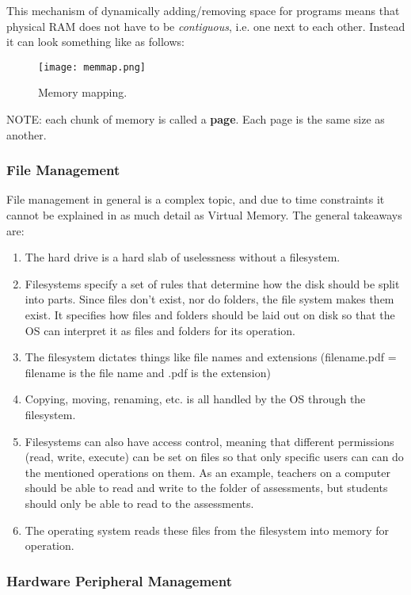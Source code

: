 \documentclass[../main.tex]{subfiles}
\begin{document}
This mechanism of dynamically adding/removing space for programs means that physical RAM does not have to be \emph{contiguous}, i.e. one next to each other. Instead it can look something like as follows:

\begin{figure}[H]
    \centering
    \texttt{[image: memmap.png]}
    \caption{Memory mapping.}
    \label{fig:memmap}
\end{figure}

NOTE: each chunk of memory is called a \textbf{page}. Each page is the same size as another.

\subsubsection{File Management}

File management in general is a complex topic, and due to time constraints it cannot be explained in as much detail as Virtual Memory. The general takeaways are:

\begin{enumerate}
    \item The hard drive is a hard slab of uselessness without a filesystem.
    \item Filesystems specify a set of rules that determine how the disk should be split into parts. Since files don't exist, nor do folders, the file system makes them exist. It specifies how files and folders should be laid out on disk so that the OS can interpret it as files and folders for its operation.
    \item The filesystem dictates things like file names and extensions (filename.pdf = filename is the file name and .pdf is the extension)
    \item Copying, moving, renaming, etc. is all handled by the OS through the filesystem.
    \item Filesystems can also have access control, meaning that different permissions (read, write, execute) can be set on files so that only specific users can can do the mentioned operations on them. As an example, teachers on a computer should be able to read and write to the folder of assessments, but students should only be able to read to the assessments.
    \item The operating system reads these files from the filesystem into memory for operation.
\end{enumerate}

\subsubsection{Hardware Peripheral Management}
\end{document}
